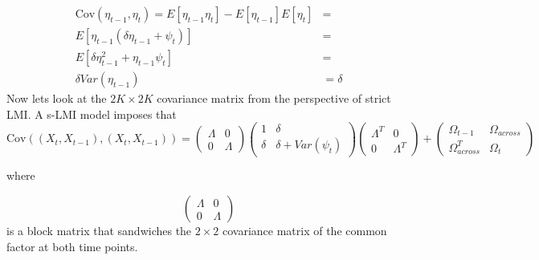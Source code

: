 \documentclass[
  letterpaper,
  DIV=11,
  numbers=noendperiod]{scrartcl}
\begin{document}
\[
\begin{align*} \text{Cov}(\eta_{t-1},\eta_t)= E[\eta_{t-1}\eta_t]-E[\eta_{t-1}]E[\eta_t]&=\\ E[\eta_{t-1}(\delta\eta_{t-1}+\psi_t)]&=\\ E[\delta\eta_{t-1}^2+\eta_{t-1}\psi_t]&=\\ \delta Var(\eta_{t-1})&= \delta \end{align*}
\] Now lets look at the \(2K\times 2K\) covariance matrix from the
perspective of strict LMI. A s-LMI model imposes that \[
\text{Cov}((X_{t},X_{t-1}),(X_{t},X_{t-1}))= \begin{pmatrix}    \Lambda & 0
\\   0 & \Lambda \end{pmatrix}  \begin{pmatrix}   1 & \delta 
\\   \delta & \delta+Var(\psi_t) \end{pmatrix} \begin{pmatrix}    \Lambda^T & 0
\\   0 & \Lambda^T \end{pmatrix} + \begin{pmatrix}   \Omega_{t-1} & \Omega_{across} 
\\   \Omega_{across}^T & \Omega_t \end{pmatrix} 
\]

where

\[\begin{pmatrix}    \Lambda & 0\\   0 & \Lambda \end{pmatrix}\] is a
block matrix that sandwiches the \(2\times2\) covariance matrix of the
common factor at both time points.
\end{document}
